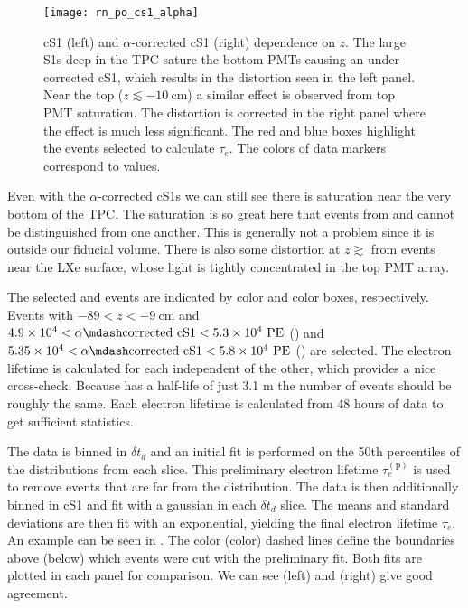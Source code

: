\begin{figure}
\centering
\texttt{[image: rn\_po\_cs1\_alpha]}
\caption{cS1 (left) and $\alpha$-corrected cS1 (right) dependence on $z$.  The large \alphadecay S1s deep in
the TPC sature the bottom PMTs causing an under-corrected cS1, which
results in the distortion seen in the left panel.  Near the top ($z \lesssim -10\ \mathrm{cm}$) a similar effect is observed from top PMT
saturation.  The distortion is corrected in the right panel where the effect is much less significant.  The red and blue boxes highlight
the events selected to calculate $\tau_e$.  The colors of data markers correspond to \stwob values.}
\label{fig:electron_lifetimes_measurement_alphas_s1}
\end{figure}

Even with the $\alpha$-corrected cS1s we can still see there is saturation near the very bottom of the TPC.  The saturation is so great
here that events from  and  cannot be distinguished from one another.  This is generally not a problem since it
is outside our fiducial volume.  There is also some distortion at $z \gtrsim$ from events
near the LXe surface, whose light is tightly concentrated in the top PMT array.

The selected  and  events are indicated by color and color boxes, respectively.  Events with
$-89< z < -9\ \mathrm{cm}$ and
$4.9 \times 10^4 < \alpha \mdash \mathrm{corrected\ cS1} < 5.3 \times 10^4\ \mathrm{PE}$ () and
$5.35 \times 10^4 < \alpha \mdash \mathrm{corrected\ cS1} < 5.8 \times 10^4\ \mathrm{PE}$ () are selected.  The electron
lifetime is calculated for each
independent of the other, which provides a nice cross-check.  Because  has a half-life of just 3.1 m the number of events
should be roughly the same.  Each electron lifetime is calculated from 48 hours of data to get sufficient statistics.

The data is binned in $\delta t_d$ and an initial fit is performed on the 50th percentiles of the \stwob distributions from each
slice.  This preliminary electron lifetime $\tau_e^{(\mathrm{p})}$ is used to remove events that are far from the distribution.  The data
is then additionally binned in cS1 and fit with a gaussian in each $\delta t_d$ slice.  The means and standard deviations are then fit
with an exponential, yielding the final electron lifetime $\tau_e$.  An example can be seen in
.  The color (color) dashed lines define the boundaries above (below) which
events were cut with the preliminary fit.  Both fits are plotted in each panel for comparison.  We can see  (left) and
 (right) give good agreement.

